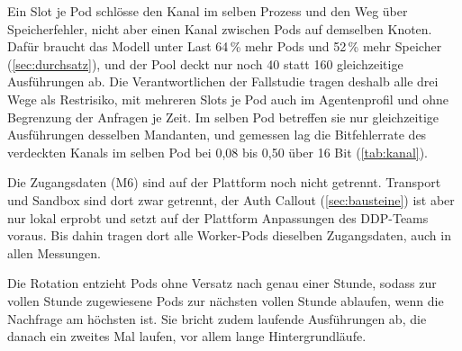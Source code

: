Ein Slot je Pod schlösse den Kanal im selben Prozess und den Weg über Speicherfehler, nicht aber einen Kanal zwischen Pods auf demselben Knoten. Dafür braucht
das Modell unter Last 64\,\% mehr Pods und 52\,\% mehr Speicher (\autoref{sec:durchsatz}), und der Pool deckt nur noch
40 statt 160 gleichzeitige Ausführungen ab. Die Verantwortlichen der Fallstudie tragen deshalb alle drei Wege als
Restrisiko, mit mehreren Slots je Pod auch im Agentenprofil und ohne Begrenzung der Anfragen je Zeit. Im selben Pod
betreffen sie nur gleichzeitige Ausführungen desselben Mandanten, und gemessen lag die Bitfehlerrate des verdeckten Kanals im selben Pod bei 0,08 bis 0,50 über 16 Bit (\autoref{tab:kanal}).

Die Zugangsdaten (M6) sind auf der Plattform noch nicht getrennt. Transport und Sandbox sind dort zwar getrennt, der Auth
Callout (\autoref{sec:bausteine}) ist aber nur lokal erprobt und setzt auf der Plattform Anpassungen des \acs{DDP}-Teams
voraus. Bis dahin tragen dort alle Worker-Pods dieselben Zugangsdaten, auch in allen Messungen.

Die Rotation entzieht Pods ohne Versatz nach genau einer Stunde, sodass zur
vollen Stunde zugewiesene Pods zur nächsten vollen Stunde ablaufen, wenn die Nachfrage am höchsten ist. Sie bricht
zudem laufende Ausführungen ab, die danach ein zweites Mal laufen, vor allem lange Hintergrundläufe.
